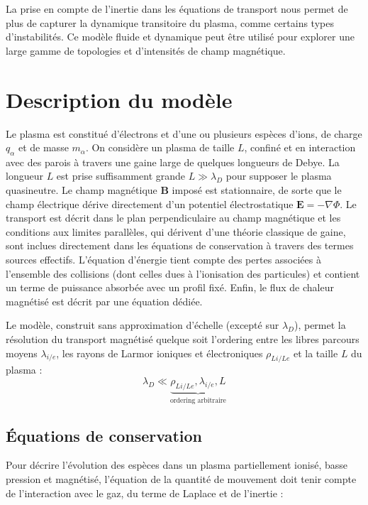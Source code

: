 \begin{refsection}
  La prise en compte de l'inertie
	dans les équations de transport nous permet de plus de capturer la dynamique transitoire du plasma, comme certains types d'instabilités. Ce modèle fluide et dynamique peut être utilisé pour explorer
		une large gamme de topologies et d'intensités de champ magnétique.

\section{Description du modèle}
Le plasma est constitué d'électrons et d'une ou plusieurs espèces d'ions, de
charge $q_\alpha$ et de masse $m_\alpha$. On considère un plasma de taille $L$,
confiné et en interaction avec des parois à travers une gaine large de quelques longueurs
de Debye. La longueur $L$ est prise suffisamment grande $L\gg\lambda_D$ pour
supposer le plasma quasineutre. Le champ magnétique $\mathbf{B}$ imposé est 
stationnaire, de sorte que le champ électrique dérive directement d'un 
potentiel électrostatique $\mathbf{E}=-\nabla \Phi$. Le transport est décrit
dans le plan perpendiculaire au champ magnétique et les conditions aux limites
parallèles, qui dérivent d'une théorie classique de gaine, sont
inclues directement dans les équations de conservation à travers des termes
sources effectifs. L'équation d'énergie tient compte des pertes
associées à l'ensemble des collisions (dont celles dues à l'ionisation des particules) et
contient un terme de puissance
absorbée avec un profil fixé. Enfin, le flux de chaleur magnétisé
est décrit par une équation dédiée.

Le modèle, construit sans approximation d'échelle (excepté sur $\lambda_D$),
permet la résolution du transport magnétisé quelque soit l'ordering entre les
libres parcours moyens $\lambda_{{i/e}}$, les rayons de Larmor ioniques et
électroniques $\rho_{L{i/Le}}$ et la taille $L$ du plasma :
\begin{equation}
\lambda_D\ll\underbrace{\rho_{L{i/Le}},\lambda_{{i/e}},L}_\text{ordering
arbitraire}
\end{equation}

\subsection{Équations de conservation}
Pour décrire l'évolution des espèces dans un plasma partiellement ionisé, basse
pression et magnétisé, l'équation de la quantité de mouvement doit tenir compte
de l'interaction avec le gaz, du terme de Laplace et de l'inertie :


\end{refsection}
